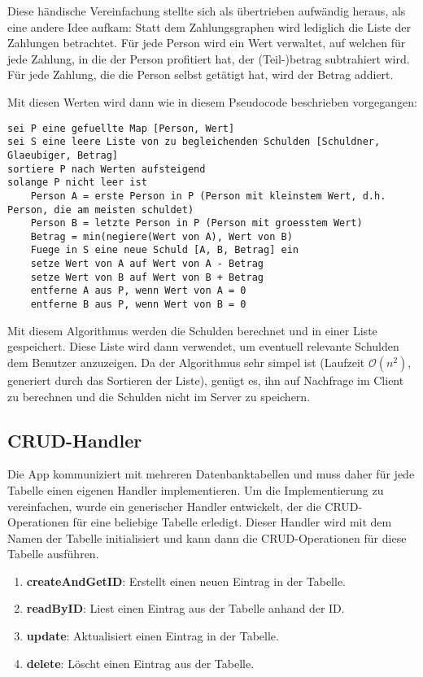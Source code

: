 Diese händische Vereinfachung stellte sich als übertrieben aufwändig heraus, als eine andere Idee aufkam:
Statt dem Zahlungsgraphen wird lediglich die Liste der Zahlungen betrachtet.
Für jede Person wird ein Wert verwaltet, auf welchen für jede Zahlung, in die der Person profitiert hat, der (Teil-)betrag subtrahiert wird.
Für jede Zahlung, die die Person selbst getätigt hat, wird der Betrag addiert. 

Mit diesen Werten wird dann wie in diesem Pseudocode beschrieben vorgegangen:

\begin{lstlisting}
sei P eine gefuellte Map [Person, Wert]
sei S eine leere Liste von zu begleichenden Schulden [Schuldner, Glaeubiger, Betrag]
sortiere P nach Werten aufsteigend
solange P nicht leer ist
    Person A = erste Person in P (Person mit kleinstem Wert, d.h. Person, die am meisten schuldet)
    Person B = letzte Person in P (Person mit groesstem Wert)
    Betrag = min(negiere(Wert von A), Wert von B)
    Fuege in S eine neue Schuld [A, B, Betrag] ein
    setze Wert von A auf Wert von A - Betrag
    setze Wert von B auf Wert von B + Betrag
    entferne A aus P, wenn Wert von A = 0
    entferne B aus P, wenn Wert von B = 0
\end{lstlisting}

Mit diesem Algorithmus werden die Schulden berechnet und in einer Liste gespeichert.
Diese Liste wird dann verwendet, um eventuell relevante Schulden dem Benutzer anzuzeigen.
Da der Algorithmus sehr simpel ist (Laufzeit $\mathcal{O}(n^2)$, generiert durch das Sortieren der Liste), genügt es, ihn auf Nachfrage im Client zu berechnen und die Schulden nicht im Server zu speichern.

\subsection{CRUD-Handler}

Die App kommuniziert mit mehreren Datenbanktabellen und muss daher für jede Tabelle einen eigenen Handler implementieren.
Um die Implementierung zu vereinfachen, wurde ein generischer Handler entwickelt, der die CRUD-Operationen für eine beliebige Tabelle erledigt.
Dieser Handler wird mit dem Namen der Tabelle initialisiert und kann dann die CRUD-Operationen für diese Tabelle ausführen.

\begin{enumerate}
    \item \textbf{createAndGetID}: Erstellt einen neuen Eintrag in der Tabelle.
    \item \textbf{readByID}: Liest einen Eintrag aus der Tabelle anhand der ID.
    \item \textbf{update}: Aktualisiert einen Eintrag in der Tabelle.
    \item \textbf{delete}: Löscht einen Eintrag aus der Tabelle.
\end{enumerate}

